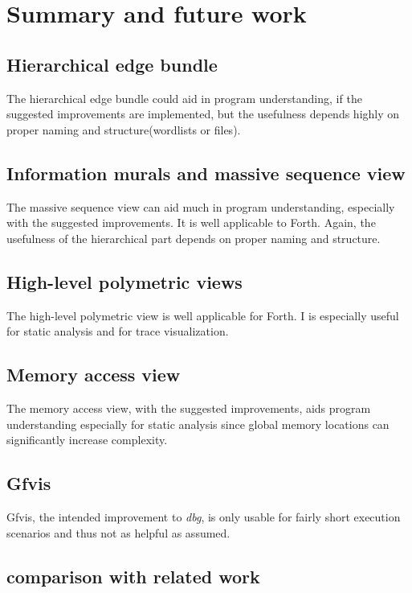 \chapter{Summary and future work}
\label{chap:Summary}

\section*{Hierarchical edge bundle}
The hierarchical edge bundle could aid in program understanding, if the suggested improvements are implemented, but the usefulness depends highly on proper naming and structure(wordlists or files).

\section*{Information murals and massive sequence view}
The massive sequence view can aid much in program understanding, especially with the suggested improvements. It is well applicable to Forth. Again, the usefulness of the hierarchical part depends on proper naming and structure.

\section*{High-level polymetric views}

The high-level polymetric view is well applicable for Forth. I is especially useful for static analysis and for trace visualization.

\section*{Memory access view}

The memory access view, with the suggested improvements, aids program understanding especially for static analysis since global memory locations can significantly increase complexity.

\section*{Gfvis}

Gfvis, the intended improvement to \emph{dbg}, is only usable for fairly short execution scenarios and thus not as helpful as assumed.

\section{comparison with related work}

